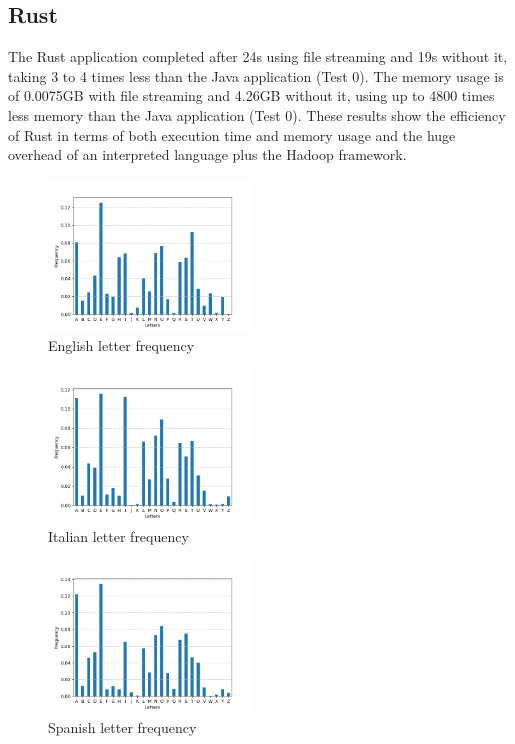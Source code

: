 \documentclass{article}
\begin{document}
\begin{multicols}{2}
    \subsection{Rust}
        The Rust application completed after 24s using file streaming and 19s without it, taking
        3 to 4 times less than the Java application (Test 0).
        The memory usage is of 0.0075GB with file streaming and 4.26GB without it, using up to
        4800 times less memory than the Java application (Test 0).
        These results show the efficiency of Rust in terms of both execution time and memory usage and
        the huge overhead of an interpreted language plus the Hadoop framework.
\begin{figure}[H]
    \centering
    \includegraphics[width=0.48\textwidth]{figures/en.png}
    \caption{English letter frequency}
    \label{fig:en_freq}
\end{figure}
\begin{figure}[H]
    \centering
    \includegraphics[width=0.48\textwidth]{figures/it.png}
    \caption{Italian letter frequency}
    \label{fig:it_freq}
\end{figure}
\begin{figure}[H]
    \centering
    \includegraphics[width=0.48\textwidth]{figures/es.png}
    \caption{Spanish letter frequency}
    \label{fig:es_freq}
\end{figure}



\end{multicols}
\end{document}
